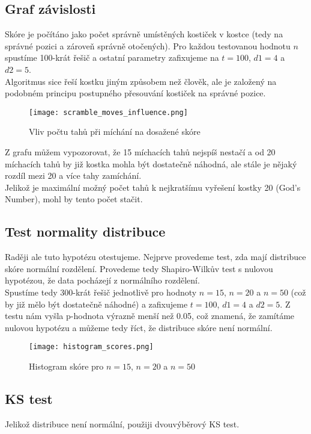 \documentclass{article}
\begin{document}
\subsection*{Graf závislosti}
Skóre je počítáno jako počet správně umístěných kostiček v kostce (tedy na správné pozici a zároveň správně otočených).
Pro každou testovanou hodnotu $n$ spustíme 100-krát řešič a ostatní parametry zafixujeme na
$t = 100$, $d1 = 4$ a $d2 = 5$.\\
Algoritmus sice řeší kostku jiným způsobem než člověk, ale je založený na podobném principu 
postupného přesouvání kostiček na správné pozice.

\begin{figure}[h]
    \centering
    \texttt{[image: scramble\_moves\_influence.png]}
    \caption{Vliv počtu tahů při míchání na dosažené skóre}
    \label{fig:scramble_moves_influence}
\end{figure}

Z grafu můžem vypozorovat, že 15 míchacích tahů nejspíš nestačí a od 20 míchacích
tahů by již kostka mohla být dostatečně náhodná, 
ale stále je nějaký rozdíl mezi 20 a více tahy zamíchání.\\
Jelikož je maximální možný počet tahů k nejkratšímu vyřešení kostky 20 (God's Number),
mohl by tento počet stačit.

\subsection*{Test normality distribuce}
Raději ale tuto hypotézu otestujeme. Nejprve provedeme test, zda mají distribuce skóre normální rozdělení.
Provedeme tedy Shapiro-Wilkův test s nulovou hypotézou, že data pocházejí z normálního rozdělení.\\
Spustíme tedy 300-krát řešič jednotlivě pro hodnoty $n = 15$, $n = 20$ a $n = 50$ (což by již mělo být dostatečně náhodné) a zafixujeme $t = 100$, $d1 = 4$ a $d2 = 5$.
Z testu nám vyšla p-hodnota výrazně menší než 0.05, což znamená, že zamítáme nulovou hypotézu a 
můžeme tedy říct, že distribuce skóre není normální.\\

\begin{figure}[h]
    \centering
    \texttt{[image: histogram\_scores.png]}
    \caption{Histogram skóre pro $n = 15$, $n = 20$ a $n = 50$}
    \label{fig:histogram_scores}
\end{figure}

\subsection*{KS test}
Jelikož distribuce není normální, použiji dvouvýběrový KS test.
\end{document}
